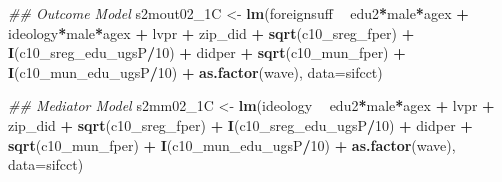 \documentclass[
]{article}
\newenvironment{Shaded}{\begin{snugshade}}{\end{snugshade}}
\newcommand{\CommentTok}[1]{\textcolor[rgb]{0.56,0.35,0.01}{\textit{#1}}}
\newcommand{\DataTypeTok}[1]{\textcolor[rgb]{0.13,0.29,0.53}{#1}}
\newcommand{\DecValTok}[1]{\textcolor[rgb]{0.00,0.00,0.81}{#1}}
\newcommand{\KeywordTok}[1]{\textcolor[rgb]{0.13,0.29,0.53}{\textbf{#1}}}
\newcommand{\NormalTok}[1]{#1}
\newcommand{\OperatorTok}[1]{\textcolor[rgb]{0.81,0.36,0.00}{\textbf{#1}}}
\newcommand{\StringTok}[1]{\textcolor[rgb]{0.31,0.60,0.02}{#1}}
\begin{document}
\begin{Shaded}
\begin{Highlighting}[]
\CommentTok{## Outcome Model }
\NormalTok{s2mout02_1C <-}\StringTok{ }\KeywordTok{lm}\NormalTok{(foreignsuff  }\OperatorTok{~}\StringTok{ }\NormalTok{edu2}\OperatorTok{*}\NormalTok{male}\OperatorTok{*}\NormalTok{agex }\OperatorTok{+}\StringTok{ }\NormalTok{ideology}\OperatorTok{*}\NormalTok{male}\OperatorTok{*}\NormalTok{agex }\OperatorTok{+}\StringTok{ }\NormalTok{lvpr }\OperatorTok{+}\StringTok{  }
\StringTok{                    }\NormalTok{zip_did }\OperatorTok{+}\StringTok{ }\KeywordTok{sqrt}\NormalTok{(c10_sreg_fper) }\OperatorTok{+}\StringTok{ }\KeywordTok{I}\NormalTok{(c10_sreg_edu_ugsP}\OperatorTok{/}\DecValTok{10}\NormalTok{) }\OperatorTok{+}\StringTok{ }
\StringTok{                    }\NormalTok{didper }\OperatorTok{+}\StringTok{ }\KeywordTok{sqrt}\NormalTok{(c10_mun_fper) }\OperatorTok{+}\StringTok{ }\KeywordTok{I}\NormalTok{(c10_mun_edu_ugsP}\OperatorTok{/}\DecValTok{10}\NormalTok{) }\OperatorTok{+}\StringTok{ }
\StringTok{                    }\KeywordTok{as.factor}\NormalTok{(wave), }\DataTypeTok{data=}\NormalTok{sifcct)}

\CommentTok{## Mediator Model}
\NormalTok{s2mm02_1C <-}\StringTok{ }\KeywordTok{lm}\NormalTok{(ideology  }\OperatorTok{~}\StringTok{ }\NormalTok{edu2}\OperatorTok{*}\NormalTok{male}\OperatorTok{*}\NormalTok{agex }\OperatorTok{+}\StringTok{ }\NormalTok{lvpr }\OperatorTok{+}\StringTok{  }
\StringTok{                  }\NormalTok{zip_did }\OperatorTok{+}\StringTok{ }\KeywordTok{sqrt}\NormalTok{(c10_sreg_fper) }\OperatorTok{+}\StringTok{ }\KeywordTok{I}\NormalTok{(c10_sreg_edu_ugsP}\OperatorTok{/}\DecValTok{10}\NormalTok{) }\OperatorTok{+}\StringTok{ }
\StringTok{                  }\NormalTok{didper }\OperatorTok{+}\StringTok{ }\KeywordTok{sqrt}\NormalTok{(c10_mun_fper) }\OperatorTok{+}\StringTok{ }\KeywordTok{I}\NormalTok{(c10_mun_edu_ugsP}\OperatorTok{/}\DecValTok{10}\NormalTok{) }\OperatorTok{+}\StringTok{ }
\StringTok{                  }\KeywordTok{as.factor}\NormalTok{(wave), }\DataTypeTok{data=}\NormalTok{sifcct)}


\end{Highlighting}
\end{Shaded}
\end{document}
